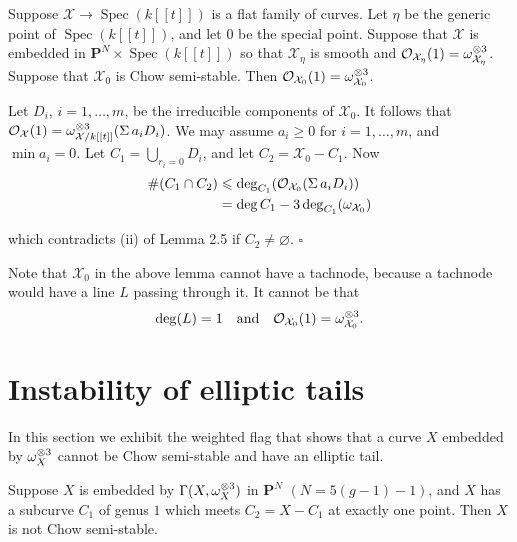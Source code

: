 \documentclass[12pt]{memoir}
\providecommand{\cX}{\mathcal{X}}
\providecommand{\Spec}{\operatorname{Spec}}
\begin{document}
\begin{Lem}\label{lem:2.6}
Suppose $\cX \to \Spec(k[[t]])$ is a flat family of curves. Let $\eta$ be the generic point of $\Spec(k[[t]])$, and let $0$ be the special point. Suppose that $\cX$ is embedded in $\mathbf{P}^N \times \Spec(k[[t]])$ so that $\cX_\eta$ is smooth and $\cO_{\cX_\eta}(1) = \om_{\cX_\eta}^{\otimes 3}$. Suppose that $\cX_0$ is Chow semi-stable. Then $\cO_{\cX_0}(1) = \om_{\cX_0}^{\otimes 3}$.
\end{Lem}

\begin{ptcbp}
Let $D_i$, $i = 1, \dots, m$, be the irreducible components of $\cX_0$. It follows that $\cO_\cX(1) = \om_{\cX/k[[t]]}^{\otimes 3}(\Sigma\, a_i D_i)$. We may assume $a_i \geqslant 0$ for $i = 1, \dots, m$, and $\min a_i = 0$. Let $C_1 = \bigcup_{r_i = 0} D_i$, and let $C_2 = \cX_0 - C_1$. Now
\begin{align*}
\#(C_1 \cap C_2) &\leqslant \deg_{C_1}(\cO_{\cX_0}(\Sigma\, a_i D_i)) \\
&= \deg C_1 - 3\deg_{C_1}(\om_{\cX_0})
\end{align*}

which contradicts (ii) of Lemma 2.5 if $C_2 \neq \varnothing$. \hfill$\square$
\end{ptcbp}

Note that $\cX_0$ in the above lemma cannot have a tachnode, because a tachnode would have a line $L$ passing through it. It cannot be that
\[
\deg(L) = 1 \quad \text{and} \quad \cO_{\cX_0}(1) = \om_{\cX_0}^{\otimes 3}.
\]

\section{Instability of elliptic tails}

In this section we exhibit the weighted flag that shows that a curve $X$ embedded by $\omega_X^{\otimes 3}$ cannot be Chow semi-stable and have an elliptic tail.

\begin{Lem}\label{lem:3.1}
Suppose $X$ is embedded by $\Gamma(X, \omega_X^{\otimes 3})$ in $\mathbf{P}^N$ $(N = 5(g-1)-1)$, and $X$ has a subcurve $C_1$ of genus $1$ which meets $C_2 = X - C_1$ at exactly one point. Then $X$ is not Chow semi-stable.
\end{Lem}
\end{document}

